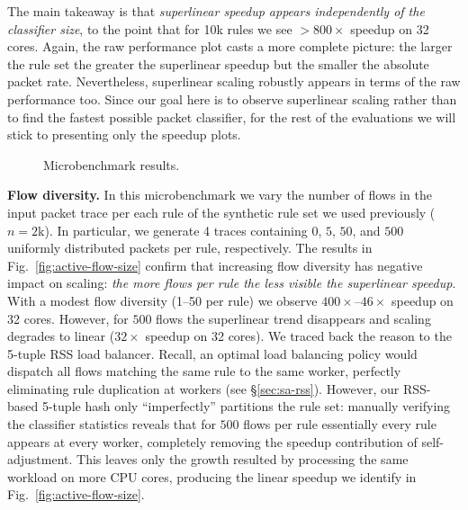 The main takeaway is that \emph{superlinear speedup appears independently of the classifier size}, to the point that for 10k rules we see $>800\times$ speedup on 32 cores. Again, the raw performance plot casts a more complete picture: the larger the rule set the greater the superlinear speedup but the smaller the absolute packet rate. Nevertheless, superlinear scaling robustly appears in terms of the raw performance too. Since our goal here is to observe superlinear scaling rather than to find the fastest possible packet classifier, for the rest of the evaluations we will stick to presenting only the speedup plots.

\begin{figure*}
  \centering
  \hspace{-1.5em}
  \hspace{-1.5em}
  \hspace{-1.5em}
  \caption{Microbenchmark results.}
  \label{fig:microbenchmark}
\end{figure*}

\noindent
\textbf{Flow diversity.} %
In this microbenchmark we vary the number of flows in the input packet trace per each rule of the synthetic rule set we used previously ($n=2$k). In particular, we generate 4 traces containing $0$, $5$, $50$, and $500$ uniformly distributed packets per rule, respectively. The results in Fig.~\ref{fig:active-flow-size} confirm that increasing flow diversity has negative impact on scaling: \emph{the more flows per rule the less visible the superlinear speedup}. With a modest flow diversity (1--50 per rule) we observe $400\times$--$46\times$ speedup on 32 cores. However, for $500$ flows the superlinear trend disappears and scaling degrades to linear ($32\times$ speedup on 32 cores). We traced back the reason to the 5-tuple RSS load balancer. Recall, an optimal load balancing policy would dispatch all flows matching the same rule to the same worker, perfectly eliminating rule duplication at workers (see \S\ref{sec:sa-rss}). However, our RSS-based 5-tuple hash only ``imperfectly'' partitions the rule set: manually verifying the classifier statistics reveals that for $500$ flows per rule essentially every rule appears at every worker, completely removing the speedup contribution of self-adjustment. This leaves only the growth resulted by processing the same workload on more CPU cores, producing the linear speedup we identify in Fig.~\ref{fig:active-flow-size}. 

